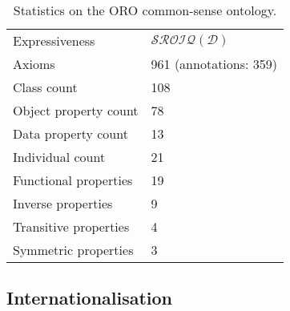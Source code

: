 \begin{table}
\begin{center}

\begin{tabular}{ll}
\toprule
Expressiveness & $\mathcal{SROIQ(D)}$ \\
Axioms & 961 (annotations: 359)\\
Class count & 108 \\
Object property count & 78 \\
Data property count & 13 \\
Individual count & 21 \\
Functional properties & 19 \\
Inverse properties & 9 \\
Transitive properties & 4 \\
Symmetric properties & 3 \\
\bottomrule

\end{tabular}
\end{center}

\caption{Statistics on the ORO common-sense ontology.}

\label{table|onto-stats}
\end{table}



\subsection{Internationalisation}
\label{sect|commonsense-i13n}
